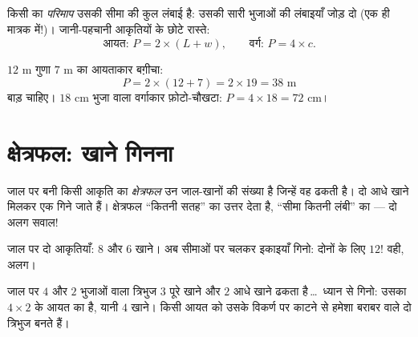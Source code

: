 \begin{definition}[परिमाप]\label{def:g4:measure:perimeter}
किसी  का \emph{परिमाप} उसकी सीमा की कुल
लंबाई है: उसकी सारी भुजाओं की लंबाइयाँ जोड़ दो (एक ही
मात्रक में!)। जानी-पहचानी आकृतियों के छोटे रास्ते:
\[
\text{आयत: } P = 2 \times (L + w),
\qquad
\text{वर्ग: } P = 4 \times c .
\]
\end{definition}

\begin{example}\label{ex:g4:measure:perimeter}
$12$ m गुणा $7$ m का आयताकार बग़ीचा:
\[
P = 2 \times (12 + 7) = 2 \times 19 = 38 \text{ m}
\]
बाड़ चाहिए। $18$ cm भुजा वाला वर्गाकार फ़ोटो-चौखटा:
$P = 4 \times 18 = 72$ cm।
\end{example}

\section{क्षेत्रफल: खाने गिनना}

\begin{definition}\label{def:g4:measure:area}
जाल पर बनी किसी आकृति का \emph{क्षेत्रफल} उन
जाल-खानों की संख्या है जिन्हें वह ढकती है। दो आधे खाने मिलकर एक
गिने जाते हैं। क्षेत्रफल ``कितनी सतह'' का उत्तर देता है, 
``सीमा कितनी लंबी'' का --- दो अलग सवाल!
\end{definition}

\begin{omfigure}

{\small जाल पर दो आकृतियाँ:  $8$ और $6$ खाने। अब
सीमाओं पर चलकर इकाइयाँ गिनो: दोनों के लिए $12$!  वही,
 अलग।}
\end{omfigure}

\begin{example}[आधे खाने]\label{ex:g4:measure:half}
जाल पर $4$ और $2$ भुजाओं वाला  त्रिभुज $3$ पूरे खाने और
$2$ आधे खाने ढकता है\,\dots\ ध्यान से गिनो: उसका 
$4 \times 2$ के आयत का  है, यानी $4$ खाने। किसी आयत को उसके
विकर्ण पर काटने से हमेशा बराबर  वाले दो त्रिभुज बनते
हैं।
\end{example}

